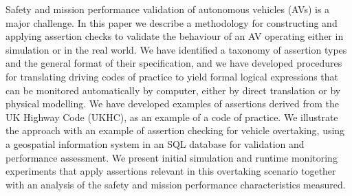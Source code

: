 Safety and mission performance validation of autonomous vehicles (AVs) is a major challenge. In this paper we describe a methodology for constructing and applying assertion checks to validate the behaviour of an AV operating either in simulation or in the real world. We have identified a taxonomy of assertion types and the general format of their specification, and we have developed procedures for translating driving codes of practice to yield formal logical expressions that can be monitored automatically by computer, either by direct translation or by physical modelling. 
%
We have developed examples of assertions derived from the UK Highway Code (UKHC), as an example of a code of practice. 
%
%
We illustrate the approach with an example of assertion checking for vehicle overtaking, using a geospatial information system in an SQL database for validation and performance assessment.
%
We present initial simulation and runtime monitoring 
experiments that apply assertions relevant in this overtaking scenario together with an analysis of the safety and mission performance characteristics measured.
%
